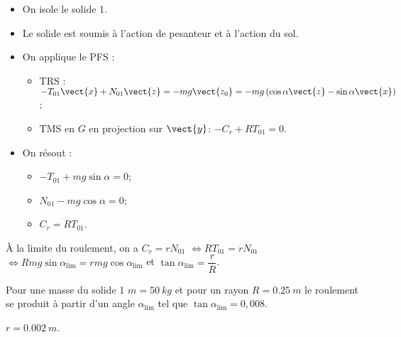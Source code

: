 \begin{multicols}{2}
\fi

\ifprof
\begin{corrige}
\begin{itemize}
\item On isole le solide 1. 
\item Le solide est soumis à l'action de pesanteur et à l'action du sol. 
\item On applique le PFS :
\begin{itemize}
\item TRS : $-T_{01}\vect{x}+N_{01}\vect{z}=-mg\vect{z_0}=-mg\left( \cos \alpha \vect{z}-\sin\alpha \vect{x} \right)$;
\item TMS en $G$ en projection sur $\vect{y}$: $-C_r+RT_{01}=0$.
\end{itemize}
\item On résout : 
\begin{itemize}
\item $-T_{01} +mg\sin\alpha = 0$;
\item $N_{01} -mg\cos\alpha = 0$;
\item $C_r=RT_{01}$.
\end{itemize}
\end{itemize}
\end{corrige}
\else
\fi


\ifprof
\begin{corrige}
À la limite du roulement, on a $C_r=rN_{01}$ $\Leftrightarrow RT_{01}=rN_{01}$ $\Leftrightarrow Rmg\sin\alpha_{\text{lim}}=rmg\cos\alpha_{\text{lim}}$ et  $\tan \alpha_{\text{lim}} = \dfrac{r}{R}$.
\end{corrige}
\else
\fi

Pour une masse du solide 1 $m = \SI{50}{kg}$ et pour un rayon $R = \SI{0,25}{m}$ le roulement se produit à partir d’un angle  $\alpha_{\text{lim}}$ tel que $\tan \alpha_{\text{lim}} = 0,008$. 

\ifprof
\begin{corrige}
$r=\SI{0,002}{m}$.
\end{corrige}
\else
\fi



\end{multicols}
